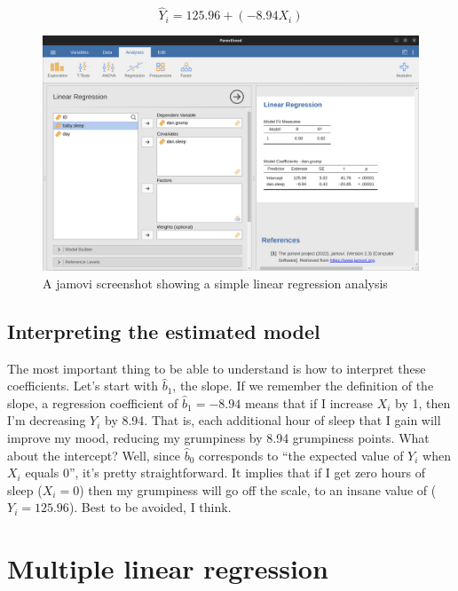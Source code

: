 \documentclass[
  a4paper,
]{book}
\begin{document}
\[\hat{Y}_i=125.96+(-8.94 X_i)\]

\begin{figure}[h!]

\includegraphics[width=1\textwidth,height=\textheight]{images/fig12-13.png} \hfill{}

\caption{\label{fig-fig12-13}A jamovi screenshot showing a simple linear
regression analysis}

\end{figure}

\hypertarget{interpreting-the-estimated-model}{%
\subsection{Interpreting the estimated
model}\label{interpreting-the-estimated-model}}

The most important thing to be able to understand is how to interpret
these coefficients. Let's start with \(\hat{b}_1\), the slope. If we
remember the definition of the slope, a regression coefficient of
\(\hat{b}_1 = -8.94\) means that if I increase \(X_i\) by 1, then I'm
decreasing \(Y_i\) by 8.94. That is, each additional hour of sleep that
I gain will improve my mood, reducing my grumpiness by 8.94 grumpiness
points. What about the intercept? Well, since \(\hat{b}_0\) corresponds
to ``the expected value of \(Y_i\) when \(X_i\) equals 0'', it's pretty
straightforward. It implies that if I get zero hours of sleep
(\(X_i = 0\)) then my grumpiness will go off the scale, to an insane
value of (\(Y_i = 125.96\)). Best to be avoided, I think.

\hypertarget{multiple-linear-regression}{%
\section{Multiple linear regression}\label{multiple-linear-regression}}
\end{document}
